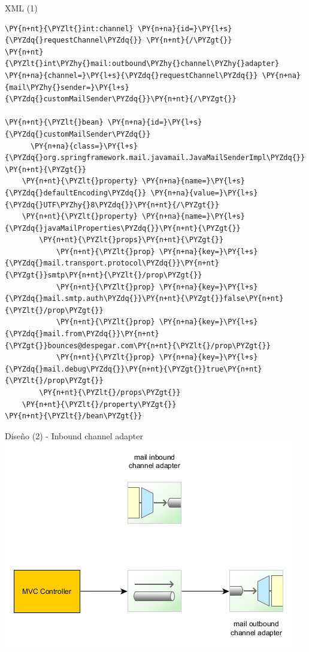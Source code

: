 \documentclass{beamer}
\begin{document}
\begin{frame}[fragile]{XML (1)}
\begin{Verbatim}[fontsize=\tiny,commandchars=\\\{\}]
\PY{n+nt}{\PYZlt{}int:channel} \PY{n+na}{id=}\PY{l+s}{\PYZdq{}requestChannel\PYZdq{}} \PY{n+nt}{/\PYZgt{}}
\PY{n+nt}{\PYZlt{}int\PYZhy{}mail:outbound\PYZhy{}channel\PYZhy{}adapter} \PY{n+na}{channel=}\PY{l+s}{\PYZdq{}requestChannel\PYZdq{}} \PY{n+na}{mail\PYZhy{}sender=}\PY{l+s}{\PYZdq{}customMailSender\PYZdq{}}\PY{n+nt}{/\PYZgt{}}

\PY{n+nt}{\PYZlt{}bean} \PY{n+na}{id=}\PY{l+s}{\PYZdq{}customMailSender\PYZdq{}} 
      \PY{n+na}{class=}\PY{l+s}{\PYZdq{}org.springframework.mail.javamail.JavaMailSenderImpl\PYZdq{}} \PY{n+nt}{\PYZgt{}}
    \PY{n+nt}{\PYZlt{}property} \PY{n+na}{name=}\PY{l+s}{\PYZdq{}defaultEncoding\PYZdq{}} \PY{n+na}{value=}\PY{l+s}{\PYZdq{}UTF\PYZhy{}8\PYZdq{}}\PY{n+nt}{/\PYZgt{}}
    \PY{n+nt}{\PYZlt{}property} \PY{n+na}{name=}\PY{l+s}{\PYZdq{}javaMailProperties\PYZdq{}}\PY{n+nt}{\PYZgt{}}
        \PY{n+nt}{\PYZlt{}props}\PY{n+nt}{\PYZgt{}}
            \PY{n+nt}{\PYZlt{}prop} \PY{n+na}{key=}\PY{l+s}{\PYZdq{}mail.transport.protocol\PYZdq{}}\PY{n+nt}{\PYZgt{}}smtp\PY{n+nt}{\PYZlt{}/prop\PYZgt{}}
            \PY{n+nt}{\PYZlt{}prop} \PY{n+na}{key=}\PY{l+s}{\PYZdq{}mail.smtp.auth\PYZdq{}}\PY{n+nt}{\PYZgt{}}false\PY{n+nt}{\PYZlt{}/prop\PYZgt{}}
            \PY{n+nt}{\PYZlt{}prop} \PY{n+na}{key=}\PY{l+s}{\PYZdq{}mail.from\PYZdq{}}\PY{n+nt}{\PYZgt{}}bounces@despegar.com\PY{n+nt}{\PYZlt{}/prop\PYZgt{}}
            \PY{n+nt}{\PYZlt{}prop} \PY{n+na}{key=}\PY{l+s}{\PYZdq{}mail.debug\PYZdq{}}\PY{n+nt}{\PYZgt{}}true\PY{n+nt}{\PYZlt{}/prop\PYZgt{}}
        \PY{n+nt}{\PYZlt{}/props\PYZgt{}}
    \PY{n+nt}{\PYZlt{}/property\PYZgt{}}
\PY{n+nt}{\PYZlt{}/bean\PYZgt{}}
\end{Verbatim}
\end{frame}

\begin{frame}{Diseño (2) - Inbound channel adapter}
\includegraphics[width=0.9\linewidth]{sp-int-02}
\end{frame}
\end{document}

